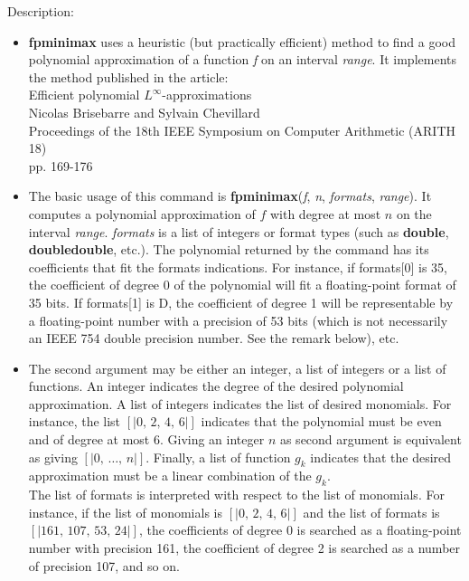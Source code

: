 \noindent Description: \begin{itemize}

\item \textbf{fpminimax} uses a heuristic (but practically efficient) method to find a
   good polynomial approximation of a function \emph{f} on an interval \emph{range}. It
   implements the method published in the article:\\
   Efficient polynomial $L^\infty$-approximations\\
   Nicolas Brisebarre and Sylvain Chevillard\\
   Proceedings of the 18th IEEE Symposium on Computer Arithmetic (ARITH 18)\\
   pp. 169-176

\item The basic usage of this command is \textbf{fpminimax}(\emph{f}, \emph{n}, \emph{formats}, \emph{range}).
   It computes a polynomial approximation of $f$ with degree at most $n$
   on the interval \emph{range}. \emph{formats} is a list of integers or format types
   (such as \textbf{double}, \textbf{doubledouble}, etc.). The polynomial returned by the
   command has its coefficients that fit the formats indications. For
   instance, if formats[0] is 35, the coefficient of degree 0 of the
   polynomial will fit a floating-point format of 35 bits. If formats[1]
   is D, the coefficient of degree 1 will be representable by a floating-point
   number with a precision of 53 bits (which is not necessarily an IEEE 754
   double precision number. See the remark below), etc.

\item The second argument may be either an integer, a list of integers or a list
   of functions. An integer indicates the degree of the desired polynomial
   approximation. A list of integers indicates the list of desired monomials.
   For instance, the list $[|0,\,2,\,4,\,6|]$ indicates that the polynomial must be
   even and of degree at most 6. Giving an integer $n$ as second argument is
   equivalent as giving $[|0,\,\dots,\,n|]$.
   Finally, a list of function $g_k$ indicates that the desired approximation
   must be a linear combination of the $g_k$.\\
   The list of formats is interpreted with respect to the list of monomials. For
   instance, if the list of monomials is $[|0,\,2,\,4,\,6|]$ and the list
   of formats is $[|161,\,107,\,53,\,24|]$, the coefficients of degree 0 is
   searched as a floating-point number with precision 161, the coefficient of
   degree 2 is searched as a number of precision 107, and so on.


\end{itemize}
